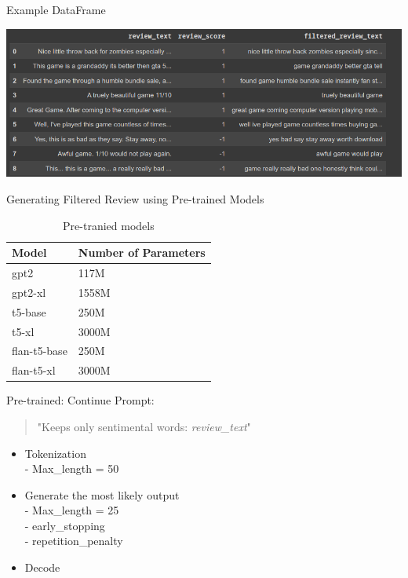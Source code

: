 \documentclass{beamer}
\begin{document}
\begin{frame}{Example DataFrame}

\includegraphics[scale=0.5]
{img/ex_data.png}
\centering
    
\end{frame}


\begin{frame}{Generating Filtered Review using Pre-trained Models}

\begin{table}[h]
\centering
\begin{tabular}{ll}
\toprule
\textbf{Model} & \textbf{Number of Parameters} \\
\midrule
gpt2 & 117M\\
gpt2-xl & 1558M\\
t5-base & 250M\\
t5-xl & 3000M\\
flan-t5-base & 250M\\
flan-t5-xl & 3000M \\
\bottomrule
\end{tabular}
\caption{Pre-tranied models}
\end{table}
\end{frame}

\begin{frame}{Pre-trained: Continue}
Prompt:
\begin{quote}
    "Keeps only sentimental words: \textit{review\_text}"
\end{quote}

\begin{itemize}
    \item Tokenization\\
    - Max\_length = 50\\
    \item Generate the most likely output\\
    - Max\_length = 25\\
    - early\_stopping\\
    - repetition\_penalty\\
    \item Decode
    
\end{itemize}


\end{frame}
\end{document}

